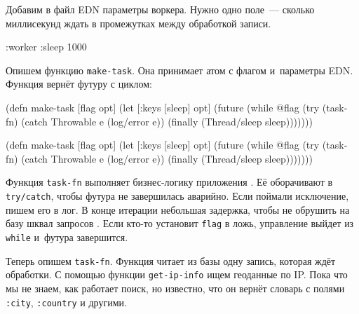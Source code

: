 Добавим в файл EDN параметры воркера. Нужно одно поле~--- сколько миллисекунд
ждать в промежутках между обработкой записи.

\begin{english}
  \begin{clojure}
{:worker {:sleep 1000}}
  \end{clojure}
\end{english}


\label{make-task}

Опишем функцию \verb|make-task|. Она принимает атом с флагом и~параметры
EDN. Функция вернёт футуру с циклом:

\ifx\DEVICETYPE\MOBILE

\begin{english}
  \begin{clojure/lines}
(defn make-task
  [flag opt]
  (let [{:keys [sleep]} opt]
    (future
      (while @flag
        (try
          (task-fn)
          (catch Throwable e
            (log/error e))
          (finally
            (Thread/sleep
              sleep)))))))
  \end{clojure/lines}
\end{english}

\else

\begin{english}
  \begin{clojure/lines}
(defn make-task
  [flag opt]
  (let [{:keys [sleep]} opt]
    (future
      (while @flag
        (try
          (task-fn)
          (catch Throwable e
            (log/error e))
          (finally
            (Thread/sleep sleep)))))))
  \end{clojure/lines}
\end{english}

\fi

Функция \verb|task-fn| выполняет бизнес-логику приложения . Её
оборачивают в \verb|try/catch|, чтобы футура не завершилась аварийно. Если
поймали исключение, пишем его в лог. В конце итерации небольшая задержка, чтобы
не обрушить на базу шквал запросов . Если кто-то установит
\verb|flag| в ложь, управление выйдет из \verb|while| и~футура завершится.

Теперь опишем \verb|task-fn|. Функция читает из базы одну запись, которая
ждёт обработки. С помощью функции \verb|get-ip-info| ищем геоданные по
IP. Пока что мы не знаем, как работает поиск, но известно, что он вернёт словарь
с полями \verb|:city|, \verb|:country| и другими.

